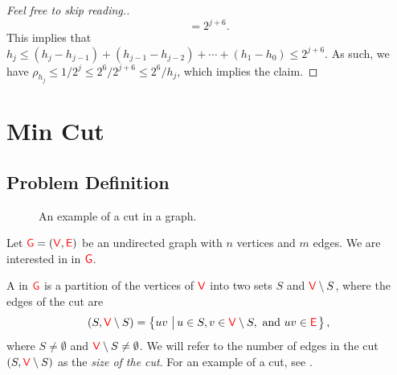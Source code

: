 \begin{proof}[Feel free to skip reading.]
\begin{equation*}
        =%
        2^{j+6}.
    \end{equation*}
    This implies that 
    \begin{math}
        h_j \leq (h_j - h_{j-1}) + (h_{j-1} - h_{j-2}) + \cdots + (h_1
        - h_0) \leq 2^{j+6}.
    \end{math}
    As such, we have
    $\rho_{h_j} \leq 1/2^{j} \leq 2^6/2^{j+6} \leq 2^6/h_j$, which
    implies the claim.
\end{proof}



\section{Min Cut}

\subsection{Problem Definition}



\begin{figure}[t]
    \centering
    \caption{An example of a cut in a graph.}
\end{figure}

Let ${\textcolor{red}{\mathsf{G}}}=({\textcolor{red}{\mathsf{V}}}, {\textcolor{red}{\mathsf{E}}})$ be an undirected graph with $n$
vertices and $m$ edges.  We are interested in  in
${\textcolor{red}{\mathsf{G}}}$.

\begin{defn}
    A  in ${\textcolor{red}{\mathsf{G}}}$ is a partition of the vertices of
    ${\textcolor{red}{\mathsf{V}}}$ into two sets $S$ and ${\textcolor{red}{\mathsf{V}}} \setminus S$,
    where the edges of the cut are
    \begin{equation*}
        (S, \Vertices \setminus S)%
        =%
        \brc{ uv \sep{ u \in S, v \in \Vertices \setminus S,
              \text{ and } uv \in \Edges}},
    \end{equation*}
    where $S \neq \emptyset$ and ${\textcolor{red}{\mathsf{V}}} \setminus S \ne
    \emptyset$. We will refer to the number of edges in the cut
    $(S, {\textcolor{red}{\mathsf{V}}} \setminus S)$ as the \emph{size of the cut}.
    For an example of a cut, see .
\end{defn}


